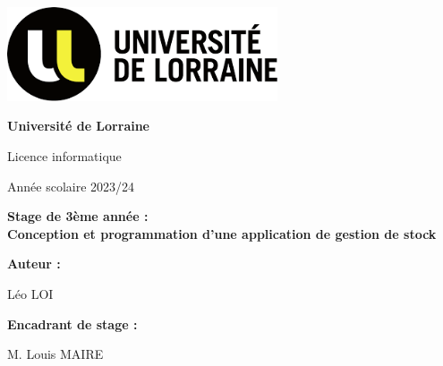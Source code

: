 

\begin{titlepage}
    \begin{center}

        \includegraphics[width=0.60\textwidth]{univ.png}

        \vspace*{1cm}

        \LARGE
        \textbf{Université de Lorraine}

        \vspace{0.5cm}
        \LARGE
        Licence informatique

        \vspace{0.5cm}
        Année scolaire 2023/24

        \vspace*{1cm}
            
        \Huge
        \textbf{Stage de 3ème année :\\Conception et programmation d'une application de gestion de stock}
            
                    
        \vspace{1.5cm}

        \Large
        \begin{minipage}[t]{0.4\textwidth}
             \textbf{Auteur :}
        \end{minipage}
        \hfill
        \begin{minipage}[t]{0.45\textwidth}
            \raggedleft
            Léo LOI
        \end{minipage}
            
            
        \vspace{2cm}
            
           
        \Large
        \begin{minipage}[t]{0.4\textwidth}
             \textbf{Encadrant de stage :}
        \end{minipage}
        \hfill
        \begin{minipage}[t]{0.45\textwidth}
            \raggedleft
            M. Louis MAIRE
        \end{minipage}


        \vspace{1cm}
            

\end{center}
\end{titlepage}
